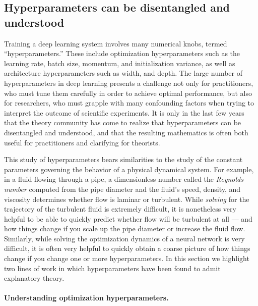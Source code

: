 \subsection{Hyperparameters can be disentangled and understood}
\label{sec:reason-hps}












Training a deep learning system involves many numerical knobs, termed ``hyperparameters.'' These include optimization hyperparameters such as the learning rate, batch size, momentum, and initialization variance, as well as architecture hyperparameters such as width, and depth.
The large number of hyperparameters in deep learning presents a challenge not only for practitioners, who must tune them carefully in order to achieve optimal performance, but also for researchers, who must grapple with many confounding factors when trying to interpret the outcome of scientific experiments.
It is only in the last few years that the theory community has come to realize that hyperparameters can be disentangled and understood, and that the resulting mathematics is often both useful for practitioners and clarifying for theorists.

This study of hyperparameters bears similarities to the study of the constant parameters governing the behavior of a physical dynamical system.
For example, in a fluid flowing through a pipe, a dimensionless number called the \textit{Reynolds number} computed from the pipe diameter and the fluid's speed, density, and viscosity determines whether flow is laminar or turbulent.
While \textit{solving} for the trajectory of the turbulent fluid is extremely difficult, it is nonetheless very helpful to be able to quickly predict whether flow will be turbulent at all --- and how things change if you scale up the pipe diameter or increase the fluid flow.
Similarly, while solving the optimization dynamics of a neural network is very difficult, it is often very helpful to quickly obtain a coarse picture of how things change if you change one or more hyperparameters.
In this section we highlight two lines of work in which hyperparameters have been found to admit explanatory theory.






\paragraph{Understanding optimization hyperparameters.}

